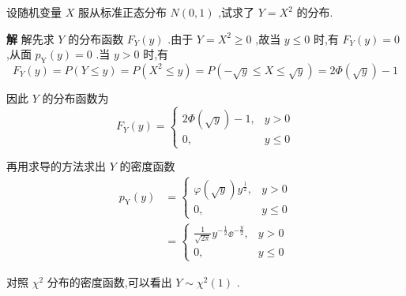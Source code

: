 \begin{example}\label{exam:2.6.3}
	设随机变量 $ X $ 服从标准正态分布 $ N(0,1) $ ,试求了 $ Y=X^{2} $ 的分布.
	
	\textbf{解} 解先求 $ Y $ 的分布函数 $ F_{Y}(y) $ .由于 $ Y=X^{2} \geqslant 0 $ ,故当 $ y \leqslant 0 $ 时,有 $ F_{Y}(y)=0 $ ,从面 $ p_{\mathrm{Y}}(y)=0 $ .当 $ y>0 $ 时,有
	\[
	F_{Y}(y)=P(Y \leqslant y)=P\left(X^{2} \leqslant y\right)=P(-\sqrt{y} \leqslant X \leqslant \sqrt{y})=2 \Phi(\sqrt{y})-1
	\]
	
	因此 $ Y $ 的分布函数为
	\[
	F_{Y}(y)=\left\{\begin{array}{cl}{2 \Phi(\sqrt{y})-1,} & {y>0} \\ {0,} & {y \leqslant 0}\end{array}\right.
	\]
	
	再用求导的方法求出 $ Y $ 的密度函数
	\[
	\begin{array}{ll}
	{p_{\mathrm{Y}}(y)} & {=\left\{
		\begin{array}{ll}
		{\varphi(\sqrt{y}) y^{\frac{1}{2}},} & {y>0} \\ 
		{0,} & {y \leqslant 0}
		\end{array}\right.}\\
	{} & {=\left\{
		\begin{array}{ll}
		{\frac{1}{\sqrt{2 \pi}} y^{-\frac{1}{2}} \ee ^{-\frac{y}{2}},} &  {y>0} \\ 
		{0,} &  {y \leqslant 0}
		\end{array}\right.}
	\end{array}
	\]
	
	对照 $ \chi^{2} $ 分布的密度函数,可以看出 $ Y \sim \chi^{2}(1) $ .	
\end{example}


